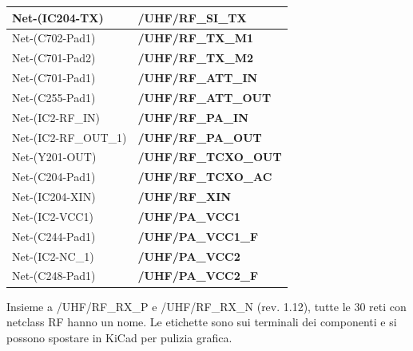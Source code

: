 {\begin{xltabular}{\linewidth}{>{\hsize\raggedright\arraybackslash}X>{\hsize\raggedright\arraybackslash}X}
Net-(IC204-TX) & \textbf{/\allowbreak{}UHF/\allowbreak{}RF\_\allowbreak{}SI\_\allowbreak{}TX} \\\midrule[0.15pt]
Net-(C702-Pad1) & \textbf{/\allowbreak{}UHF/\allowbreak{}RF\_\allowbreak{}TX\_\allowbreak{}M1} \\\midrule[0.15pt]
Net-(C701-Pad2) & \textbf{/\allowbreak{}UHF/\allowbreak{}RF\_\allowbreak{}TX\_\allowbreak{}M2} \\\midrule[0.15pt]
Net-(C701-Pad1) & \textbf{/\allowbreak{}UHF/\allowbreak{}RF\_\allowbreak{}ATT\_\allowbreak{}IN} \\\midrule[0.15pt]
Net-(C255-Pad1) & \textbf{/\allowbreak{}UHF/\allowbreak{}RF\_\allowbreak{}ATT\_\allowbreak{}OUT} \\\midrule[0.15pt]
Net-(IC2-RF\_\allowbreak{}IN) & \textbf{/\allowbreak{}UHF/\allowbreak{}RF\_\allowbreak{}PA\_\allowbreak{}IN} \\\midrule[0.15pt]
Net-(IC2-RF\_\allowbreak{}OUT\_\allowbreak{}1) & \textbf{/\allowbreak{}UHF/\allowbreak{}RF\_\allowbreak{}PA\_\allowbreak{}OUT} \\\midrule[0.15pt]
Net-(Y201-OUT) & \textbf{/\allowbreak{}UHF/\allowbreak{}RF\_\allowbreak{}TCXO\_\allowbreak{}OUT} \\\midrule[0.15pt]
Net-(C204-Pad1) & \textbf{/\allowbreak{}UHF/\allowbreak{}RF\_\allowbreak{}TCXO\_\allowbreak{}AC} \\\midrule[0.15pt]
Net-(IC204-XIN) & \textbf{/\allowbreak{}UHF/\allowbreak{}RF\_\allowbreak{}XIN} \\\midrule[0.15pt]
Net-(IC2-VCC1) & \textbf{/\allowbreak{}UHF/\allowbreak{}PA\_\allowbreak{}VCC1} \\\midrule[0.15pt]
Net-(C244-Pad1) & \textbf{/\allowbreak{}UHF/\allowbreak{}PA\_\allowbreak{}VCC1\_\allowbreak{}F} \\\midrule[0.15pt]
Net-(IC2-NC\_\allowbreak{}1) & \textbf{/\allowbreak{}UHF/\allowbreak{}PA\_\allowbreak{}VCC2} \\\midrule[0.15pt]
Net-(C248-Pad1) & \textbf{/\allowbreak{}UHF/\allowbreak{}PA\_\allowbreak{}VCC2\_\allowbreak{}F} \\
\end{xltabular}}

Insieme a /\allowbreak{}UHF/\allowbreak{}RF\_\allowbreak{}RX\_\allowbreak{}P e /\allowbreak{}UHF/\allowbreak{}RF\_\allowbreak{}RX\_\allowbreak{}N (rev. 1.12), tutte le 30 reti con netclass RF hanno un nome. Le etichette sono sui terminali dei componenti e si possono spostare in KiCad per pulizia grafica.

